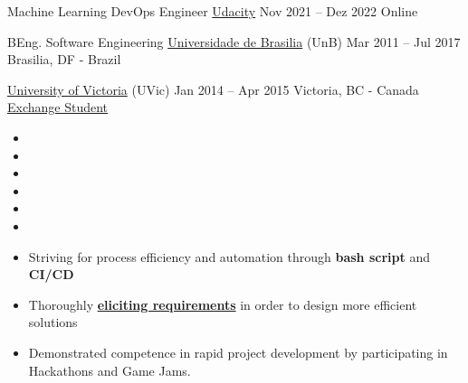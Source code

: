 \par
{}

\cveducation
{\normalsize Machine Learning DevOps Engineer}
{\href{https://confirm.udacity.com/VWERCDCT}{Udacity}}
{Nov 2021 -- Dez 2022}
{Online}
{}

\hfill

\cveducation
{\normalsize BEng. Software Engineering}
{\href{https://fga.unb.br/software}{Universidade de Brasilia} (UnB)}
{Mar 2011 -- Jul 2017}
{Brasilia, DF - Brazil}
{}

\cveducation
{}
{\href{https://www.uvic.ca/}{University of Victoria} (UVic)}
{Jan 2014 -- Apr 2015}
{Victoria, BC - Canada}
{\href{http://www.cienciasemfronteiras.gov.br/web/csf/o-programa}{Exchange Student}}
\smallskip


\hfill



\begin{itemize}
\item[\scriptsize\color{midaccent}\faComments] 
\item[\scriptsize\color{midaccent}\faComments] \par
\divider
\item[\scriptsize\color{midaccent}\faCode] 
\item[\scriptsize\color{midaccent}\faCode] 
\item[\scriptsize\color{midaccent}\faCode] 
\item[\scriptsize\color{midaccent}\faCode] \par
\end{itemize}

\hfill



{\justifying\color{description}
\begin{itemize}[leftmargin=0.61em]
\item[\color{midaccent}\faAngleRight] Striving for process efficiency and automation through {\bfseries\color{tech}bash script} and {\bfseries\color{tech}CI/CD}
\item[\color{midaccent}\faAngleRight] Thoroughly {\bfseries\color{tech}\href{http://swebokwiki.org/Chapter_1:_Software_Requirements#Software_Requirements_Fundamentals}{eliciting requirements}} in order to design more efficient solutions
\item[\color{midaccent}\faAngleRight] Demonstrated competence in rapid project development by participating in Hackathons and Game Jams.

\end{itemize}
}

